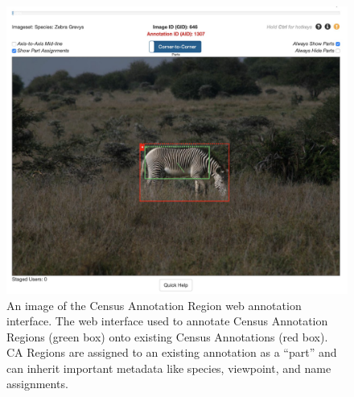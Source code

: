 \begin{figure}[!t]
    \begin{center}
        \includegraphics[width=0.70\linewidth]{resources/ca-ui-example.pdf}
    \end{center}
    \caption{An image of the Census Annotation Region web annotation interface.  The web interface used to annotate Census Annotation Regions (green box) onto existing Census Annotations (red box).  CA Regions are assigned to an existing annotation as a ``part'' and can inherit important metadata like species, viewpoint, and name assignments.}
    \label{fig:ca-interface}
\end{figure}

